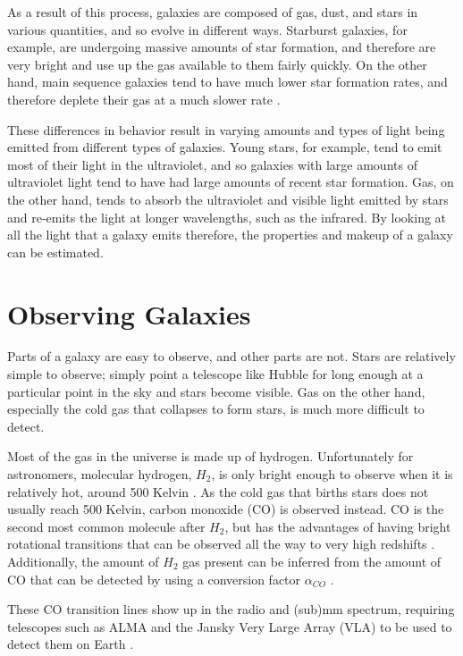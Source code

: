 \documentclass[twoside,single]{lion-msc}
\begin{document}
As a result of this process, galaxies are composed of gas, dust, and stars in various quantities, and so evolve in different ways. Starburst galaxies, for example, are undergoing massive amounts of star formation, and therefore are very bright and use up the gas available to them fairly quickly. On the other hand, main sequence galaxies tend to have much lower star formation rates, and therefore deplete their gas at a much slower rate \cite{scoville2017evolution, silverman2015higher}.

These differences in behavior result in varying amounts and types of light being emitted from different types of galaxies. Young stars, for example, tend to emit most of their light in the ultraviolet, and so galaxies with large amounts of ultraviolet light tend to have had large amounts of recent star formation. Gas, on the other hand, tends to absorb the ultraviolet and visible light emitted by stars and re-emits the light at longer wavelengths, such as the infrared. By looking at all the light that a galaxy emits therefore, the properties and makeup of a galaxy can be estimated.

\section{Observing Galaxies}

Parts of a galaxy are easy to observe, and other parts are not. Stars are relatively simple to observe; simply point a telescope like Hubble for long enough at a particular point in the sky and stars become visible. Gas on the other hand, especially the cold gas that collapses to form stars, is much more difficult to detect.

Most of the gas in the universe is made up of hydrogen. Unfortunately for astronomers, molecular hydrogen, $H_2$, is only bright enough to observe when it is relatively hot, around 500 Kelvin \cite{decarli2019alma}. As the cold gas that births stars does not usually reach 500 Kelvin, carbon monoxide (CO) is observed instead. CO is the second most common molecule after $H_2$, but has the advantages of having bright rotational transitions that can be observed all the way to very high redshifts \cite{walter2016alma, decarli2019alma}. Additionally, the amount of $H_2$ gas present can be inferred from the amount of CO that can be detected by using a conversion factor $\alpha_{CO}$ \cite{decarli2019alma}. 

These CO transition lines show up in the radio and (sub)mm spectrum, requiring telescopes such as ALMA and the Jansky Very Large Array (VLA) to be used to detect them on Earth \cite{decarli2019alma}. 
\end{document}
